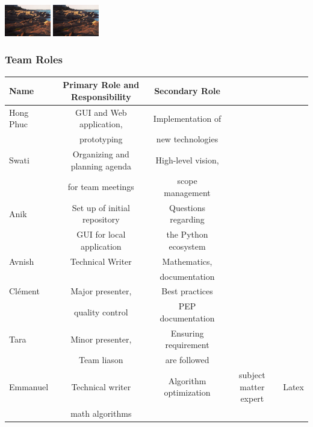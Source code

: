 \documentclass{beamer}
\begin{document}
\begin{frame}
  \hfil\hfil\includegraphics[width=2cm]{Screen Shot}
  \hfil\hfil\hfil\includegraphics[width=2cm]{Screen Shot}\newline
  \null\hfil\hfil{}
  \hfil\hfil\makebox[2cm]{\[x^y\]}
  \hfil\hfil{}\newline
  \end{frame}
  
  
  
    \begin{frame}
  \frametitle{Team Roles}
  \begin{table}
\begin{tabular}{l | c | c | c | c }
Name & Primary Role and Responsibility & Secondary Role \\
\hline
Hong Phuc & GUI and Web application,& Implementation of\\
& prototyping & new technologies\\
 \hline
Swati & Organizing and planning agenda& High-level vision, \\
& for team meetings & scope management\\
 \hline
Anik & Set up of initial repository& Questions regarding\\
& GUI for local application & the Python ecosystem\\
 \hline
Avnish & Technical Writer & Mathematics, \\
& & documentation\\
 \hline
Clément & Major presenter, & Best practices \\
& quality control  & PEP documentation\\
 \hline
Tara & Minor presenter, & Ensuring requirement \\
& Team liason  & are followed\\
 \hline
Emmanuel & Technical writer &  Algorithm optimization
& subject matter expert  & Latex\\
& math algorithms  & \\
\end{tabular}
\end{table}
  \end{frame}
\end{document}
